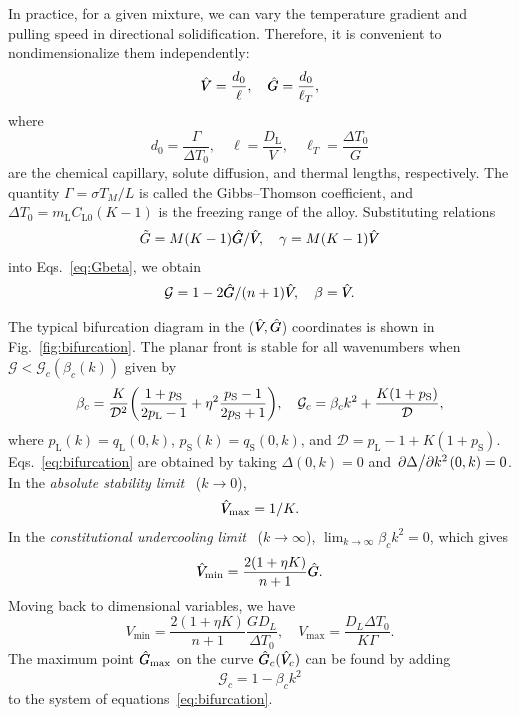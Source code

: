 \documentclass{article}
\newcommand{\liq}{\text{L}}
\newcommand{\sol}{\text{S}}
\newcommand{\qL}{q_\liq}
\newcommand{\qS}{q_\sol}
\newcommand{\pL}{p_\liq}
\newcommand{\pS}{p_\sol}
\newcommand{\hV}[1][\qty(\bar{V})]{\vphantom{#1}\mathrlap{\smash{\hat{V}}}V}
\newcommand{\hG}[1][\qty(\bar{G})]{\vphantom{#1}\mathrlap{\smash{\hat{G}}}G}
\begin{document}
In practice, for a given mixture, we can vary the temperature gradient and pulling speed in directional solidification.
Therefore, it is convenient to nondimensionalize them independently:
\begin{equation}\label{eq:hatGV}
    \hV = \frac{d_0}{\ell}, \quad \hG = \frac{d_0}{\ell_T},
\end{equation}
where
\begin{equation}\label{eq:lengths}
    d_0 = \frac{\Gamma}{\Delta{T}_0}, \quad
    \ell = \frac{D_\liq}{V}, \quad \ell_T = \frac{\Delta{T}_0}{G}
\end{equation}
are the chemical capillary, solute diffusion, and thermal lengths, respectively.
The quantity $\Gamma = \sigma T_M/L$ is called the Gibbs--Thomson coefficient,
and $\Delta{T}_0 = m_\liq C_{\liq0}(K-1)$ is the freezing range of the alloy.
Substituting relations
\begin{equation}\label{eq:tildeGgamma}
    \tilde{G} = M(K-1)\hG/\hV, \quad \gamma = M(K-1)\hV
\end{equation}
into Eqs.~\eqref{eq:Gbeta}, we obtain
\begin{equation}\label{eq:Gbeta2}
    \mathcal{G} = 1 - 2\hG/(n+1)\hV, \quad \beta = \hV.
\end{equation}

The typical bifurcation diagram in the ($\hV,\hG$) coordinates is shown in Fig.~\ref{fig:bifurcation}.
The planar front is stable for all wavenumbers when $\mathcal{G} < \mathcal{G}_c(\beta_c(k))$ given by
\begin{equation}\label{eq:bifurcation}
    \beta_c = \frac{K}{\mathcal{D}^2}\qty(\frac{1+\pS}{2\pL-1} + \eta^2\frac{\pS-1}{2\pS+1}), \quad
    \mathcal{G}_c = \beta_c k^2 + \frac{K(1+\pS)}{\mathcal{D}},
\end{equation}
where $\pL(k)=\qL(0,k)$, $\pS(k)=\qS(0,k)$, and $\mathcal{D} = \pL-1 + K(1+\pS)$.
Eqs.~\eqref{eq:bifurcation} are obtained by taking $\Delta(0,k)=0$ and ${\pdv*{\Delta}{k^2}}(0,k)=0$.
In the \emph{absolute stability limit}~\cite{mullins1964stability} ($k\to0$),
\begin{equation}\label{eq:Vmax}
    \hV_\text{max} = 1/K.
\end{equation}
In the \emph{constitutional undercooling limit}~\cite{tiller1953redistribution} ($k\to\infty$),
$\lim_{k\to\infty}\beta_ck^2 = 0$, which gives
\begin{equation}\label{eq:Vmin}
    \hV_\text{min} = \frac{2(1+\eta K)}{n+1}\hG.
\end{equation}
Moving back to dimensional variables, we have
\begin{equation}\label{eq:Vminmax}
    V_\text{min} = \frac{2(1+\eta K)}{n+1}\frac{GD_L}{\Delta{T}_0}, \quad
    V_\text{max} = \frac{D_L\Delta{T}_0}{K\Gamma}.
\end{equation}
The maximum point $\hG_\text{max}$ on the curve $\hG_c(\hV_c)$ can be found by adding
\begin{equation}\label{eq:Gmax}
    \mathcal{G}_c = 1 - \beta_ck^2
\end{equation}
to the system of equations~\eqref{eq:bifurcation}.
\end{document}
